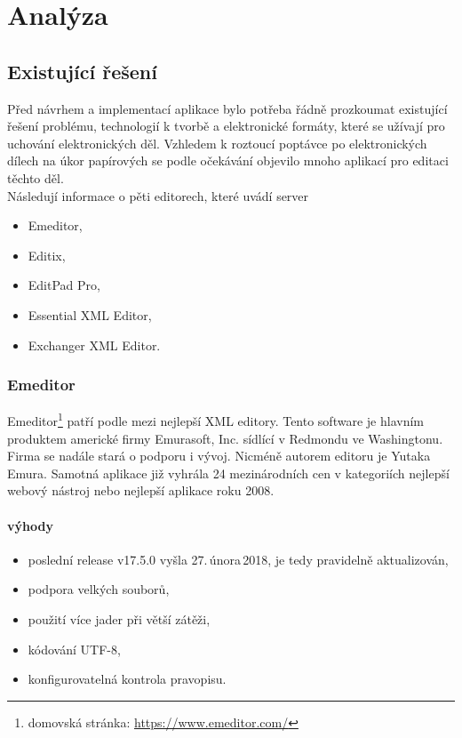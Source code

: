 \chapter{Analýza}

    \section{Existující řešení}
        Před návrhem a implementací aplikace bylo potřeba řádně prozkoumat existující řešení problému, technologií k tvorbě a elektronické formáty, které se užívají pro uchování elektronických děl. Vzhledem k roztoucí poptávce po elektronických dílech na úkor papírových se podle očekávání objevilo mnoho aplikací pro editaci těchto děl.\\
        Následují informace o pěti editorech, které uvádí server \cite{tei-wiki} 
        \begin{itemize}
            \item Emeditor,
            \item Editix,
            \item EditPad Pro,
            \item Essential XML Editor,
            \item Exchanger XML Editor.
        \end{itemize}

        \subsection{Emeditor}
            Emeditor\footnote{domovská stránka: \url{https://www.emeditor.com/}} patří podle \cite{tei-wiki} mezi nejlepší XML editory. Tento software je hlavním produktem americké firmy Emurasoft, Inc. sídlící v Redmondu ve Washingtonu. Firma se nadále stará o podporu i vývoj. Nicméně autorem editoru je Yutaka Emura. Samotná aplikace již vyhrála 24 mezinárodních cen v kategoriích nejlepší webový nástroj nebo nejlepší aplikace roku 2008. 
            
            \subsubsection{výhody}
                \begin{itemize}
                    \item poslední release v17.5.0 vyšla 27.\,února\,2018, je tedy pravidelně aktualizován,
                    \item podpora velkých souborů,
                    \item použití více jader při větší zátěži,
                    \item kódování UTF-8,
                    \item konfigurovatelná kontrola pravopisu.
                \end{itemize}
                
